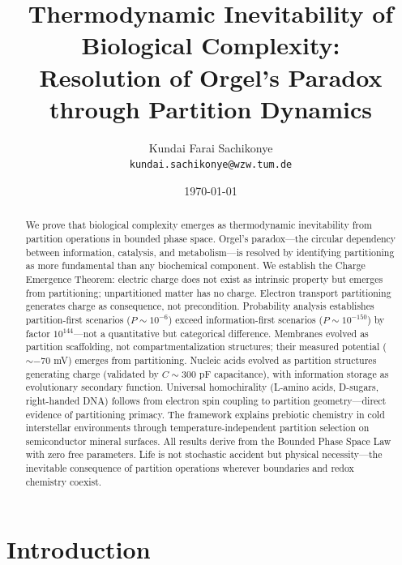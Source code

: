 \documentclass[twocolumn,10pt,a4paper]{article}
\theoremstyle{definition}
\theoremstyle{remark}
\begin{document}
\title{\textbf{Thermodynamic Inevitability of Biological Complexity:\\Resolution of Orgel's Paradox through Partition Dynamics}}

\author{
Kundai Farai Sachikonye\\
\texttt{kundai.sachikonye@wzw.tum.de}
}

\date{\today}

\maketitle

\begin{abstract}
\noindent We prove that biological complexity emerges as thermodynamic inevitability from partition operations in bounded phase space. Orgel's paradox---the circular dependency between information, catalysis, and metabolism---is resolved by identifying partitioning as more fundamental than any biochemical component. We establish the Charge Emergence Theorem: electric charge does not exist as intrinsic property but emerges from partitioning; unpartitioned matter has no charge. Electron transport partitioning generates charge as consequence, not precondition. Probability analysis establishes partition-first scenarios ($P \sim 10^{-6}$) exceed information-first scenarios ($P \sim 10^{-150}$) by factor $10^{144}$---not a quantitative but categorical difference. Membranes evolved as partition scaffolding, not compartmentalization structures; their measured potential ($\sim -70$ mV) emerges from partitioning. Nucleic acids evolved as partition structures generating charge (validated by $C \sim 300$ pF capacitance), with information storage as evolutionary secondary function. Universal homochirality (L-amino acids, D-sugars, right-handed DNA) follows from electron spin coupling to partition geometry---direct evidence of partitioning primacy. The framework explains prebiotic chemistry in cold interstellar environments through temperature-independent partition selection on semiconductor mineral surfaces. All results derive from the Bounded Phase Space Law with zero free parameters. Life is not stochastic accident but physical necessity---the inevitable consequence of partition operations wherever boundaries and redox chemistry coexist.
\end{abstract}

\section{Introduction}
\label{sec:introduction}
\end{document}
